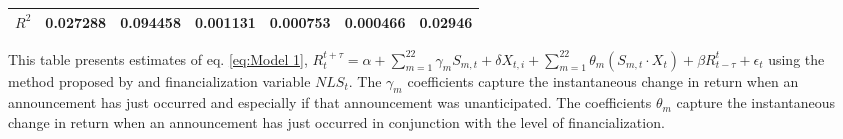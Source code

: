 \begin{sidewaystable}
{\begin{tabular}{@{}lllllllllllll@{}}
\textbf{$R^2$}             &\multicolumn{2}{c}{ 0.027288 }                                                 & \multicolumn{2}{c}{ 0.094458 }                                                 & \multicolumn{2}{c}{ 0.001131 }                                                 & \multicolumn{2}{c}{ 0.000753 }                                                 & \multicolumn{2}{c}{ 0.000466 }                                                   & \multicolumn{2}{c}{ 0.02946 }                                                 \\ \bottomrule 
\end{tabular}
}
\begin{tablenotes}\item 
    \singlespacing
    \footnotesize
    This table presents estimates of eq. \ref{eq:Model 1}, $R_{t}^{t+\tau}=\alpha+\sum_{m=1}^{22} \gamma_m S_{m,t}+ \delta X_{t,i} + \sum_{m=1}^{22} \theta_m (S_{m,t} \cdot X_t)+\beta R_{t-\tau}^{t}+\epsilon_{t}$ using the method proposed by \citet{kurov2019price} and financialization variable $NLS_t$. The $\gamma_m$ coefficients capture the instantaneous change in return when an announcement has just occurred and especially if that announcement was unanticipated. The coefficients $\theta_m$ capture the instantaneous change in return when an announcement has just occurred in conjunction with the level of financialization.
\end{tablenotes}
\end{sidewaystable}



